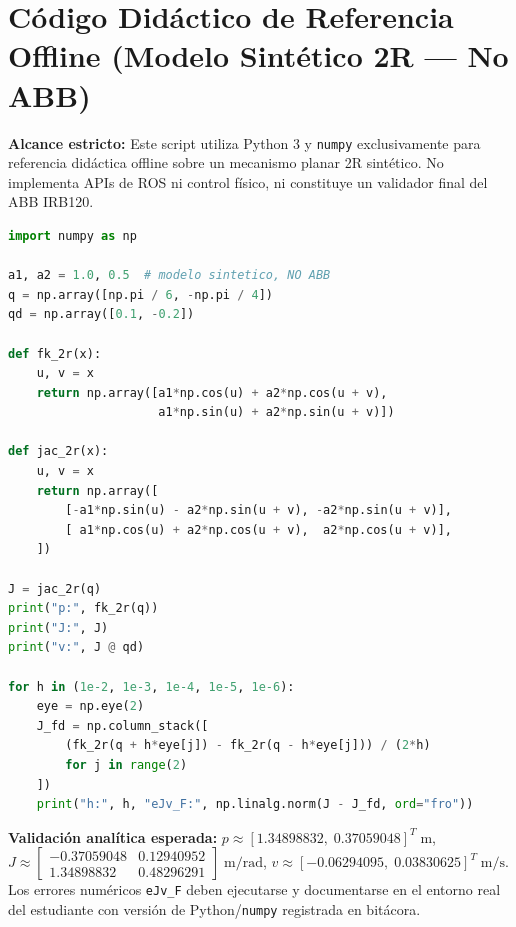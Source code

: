 \documentclass[10.5pt, a4paper]{article}
\begin{document}
\section{Código Didáctico de Referencia Offline (Modelo Sintético 2R — No ABB)}
\begin{tcolorbox}[colback=yellow!10, colframe=orange!85!black, left=2mm, right=2mm, top=1mm, bottom=1mm]
    \footnotesize\raggedright
    \textbf{Alcance estricto:} Este script utiliza Python 3 y \texttt{numpy} exclusivamente para referencia didáctica offline sobre un mecanismo planar 2R sintético. No implementa APIs de ROS ni control físico, ni constituye un validador final del ABB IRB120.
\end{tcolorbox}

\begin{lstlisting}[language=Python]
import numpy as np

a1, a2 = 1.0, 0.5  # modelo sintetico, NO ABB
q = np.array([np.pi / 6, -np.pi / 4])
qd = np.array([0.1, -0.2])

def fk_2r(x):
    u, v = x
    return np.array([a1*np.cos(u) + a2*np.cos(u + v),
                     a1*np.sin(u) + a2*np.sin(u + v)])

def jac_2r(x):
    u, v = x
    return np.array([
        [-a1*np.sin(u) - a2*np.sin(u + v), -a2*np.sin(u + v)],
        [ a1*np.cos(u) + a2*np.cos(u + v),  a2*np.cos(u + v)],
    ])

J = jac_2r(q)
print("p:", fk_2r(q))
print("J:", J)
print("v:", J @ qd)

for h in (1e-2, 1e-3, 1e-4, 1e-5, 1e-6):
    eye = np.eye(2)
    J_fd = np.column_stack([
        (fk_2r(q + h*eye[j]) - fk_2r(q - h*eye[j])) / (2*h)
        for j in range(2)
    ])
    print("h:", h, "eJv_F:", np.linalg.norm(J - J_fd, ord="fro"))
\end{lstlisting}

\noindent\textbf{Validación analítica esperada:} $p \approx [1.34898832,\; 0.37059048]^T\;\mathrm{m}$, $J \approx \begin{bmatrix} -0.37059048 & 0.12940952 \\ 1.34898832 & 0.48296291 \end{bmatrix}\;\mathrm{m/rad}$, $v \approx [-0.06294095,\; 0.03830625]^T\;\mathrm{m/s}$. Los errores numéricos \texttt{eJv\_F} deben ejecutarse y documentarse en el entorno real del estudiante con versión de Python/\texttt{numpy} registrada en bitácora.
\end{document}
